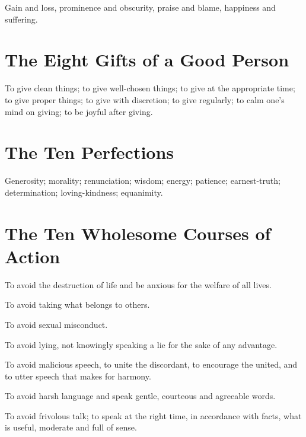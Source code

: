 Gain and loss, prominence and obscurity, praise and blame, happiness and suffering.


\ifhandbookedition
\vspace*{-\baselineskip}
\fi

\section*{The Eight Gifts of a Good Person}

To give clean things; to give well-chosen things; to give at the appropriate
time; to give proper things; to give with discretion; to give regularly; to calm
one's mind on giving; to be joyful after giving.


\ifhandbookedition
\vspace*{-\baselineskip}
\fi

\section*{The Ten Perfections}

Generosity; morality; renunciation; wisdom; energy; patience; earnest-truth;
determination; loving-kindness; equanimity.


\ifhandbookedition
\vspace*{-\baselineskip}
\fi

\section*{The Ten Wholesome Courses of Action}

To avoid the destruction of life and be anxious for the welfare of all lives.

To avoid taking what belongs to others.

To avoid sexual misconduct.

To avoid lying, not knowingly speaking a lie for the sake of any advantage.

To avoid malicious speech, to unite the discordant, to encourage the united, and
to utter speech that makes for harmony.

To avoid harsh language and speak gentle, courteous and agreeable words.

To avoid frivolous talk; to speak at the right time, in accordance with facts,
what is useful, moderate and full of sense.

